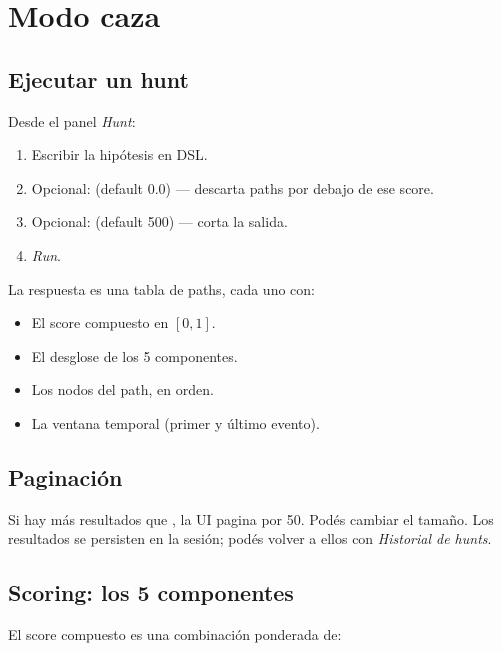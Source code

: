 \chapter{Modo caza}
\label{sec:man-caza}

\section{Ejecutar un hunt}

Desde el panel \emph{Hunt}:

\begin{enumerate}
    \item Escribir la hipótesis en DSL.
    \item Opcional:  (default 0.0) — descarta paths
    por debajo de ese score.
    \item Opcional:  (default 500) — corta la
    salida.
    \item \emph{Run}.
\end{enumerate}

La respuesta es una tabla de paths, cada uno con:

\begin{itemize}
    \item El score compuesto en $[0, 1]$.
    \item El desglose de los 5 componentes.
    \item Los nodos del path, en orden.
    \item La ventana temporal (primer y último evento).
\end{itemize}

\section{Paginación}

Si hay más resultados que , la UI pagina por 50.
Podés cambiar el tamaño. Los resultados se persisten en la sesión;
podés volver a ellos con \emph{Historial de hunts}.

\section{Scoring: los 5 componentes}

El score compuesto es una combinación ponderada de:

